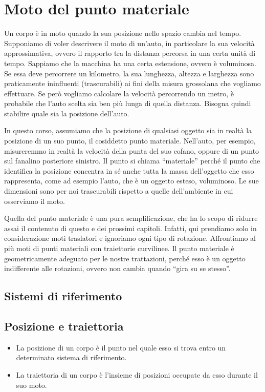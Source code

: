 \marginpar{\minitoc}

\section{Moto del punto materiale}
Un corpo è in moto quando la sua posizione nello spazio cambia nel tempo.
Supponiamo di voler descrivere il moto di un'auto, in particolare la sua
velocità approssimativa, ovvero il rapporto tra la distanza percorsa in
una certa unità di tempo.
Sappiamo che la macchina ha una certa estensione, ovvero è
voluminosa. Se essa deve percorrere un kilometro, la sua lunghezza,
altezza e larghezza sono praticamente ininfluenti (trascurabili) ai fini della misura
grossolana che vogliamo effettuare. Se però vogliamo calcolare la velocità
percorrendo un metro, è probabile che l'auto scelta sia ben più lunga
di quella distanza. Bisogna quindi stabilire quale sia la posizione
dell'auto.

In questo corso, assumiamo che la posizione di qualsiasi oggetto sia
in realtà la posizione di un suo punto, il cosiddetto punto materiale.
Nell'auto, per esempio, misureremmo in realtà la velocità della punta
del suo cofano, oppure di un punto sul fanalino posteriore sinistro.
Il punto si chiama ``materiale'' perché il punto che identifica la
posizione concentra in sé anche tutta la massa dell'oggetto che esso
rappresenta, come ad esempio l'auto, che è un oggetto esteso,
voluminoso. Le sue dimensioni sono per noi trascurabili rispetto
a quelle dell'ambiente in cui osserviamo il moto.

Quella del punto materiale è una pura semplificazione, che ha lo scopo
di ridurre assai il contenuto di questo e dei prossimi capitoli.
Infatti, qui prendiamo solo in considerazione moti traslatori e ignoriamo
ogni tipo di rotazione. Affrontiamo al più moti di punti materiali
con traiettorie curvilinee. Il punto materiale è geometricamente adeguato
per le nostre trattazioni, perché esso è un oggetto indifferente alle
rotazioni, ovvero non cambia quando ``gira su se stesso''.

\subsection{Sistemi di riferimento}

\subsection{Posizione e traiettoria}
\begin{tcolorbox}[colback = yellow!30, colframe = yellow!30!black, title = {Posizione e traiettoria}]
\begin{itemize}
    \item La posizione di un corpo è il punto nel quale esso si trova entro un
    determinato sistema di riferimento.

    \item La traiettoria di un corpo è l'insieme di posizioni occupate da esso
    durante il suo moto.
\end{itemize}
\end{tcolorbox}



